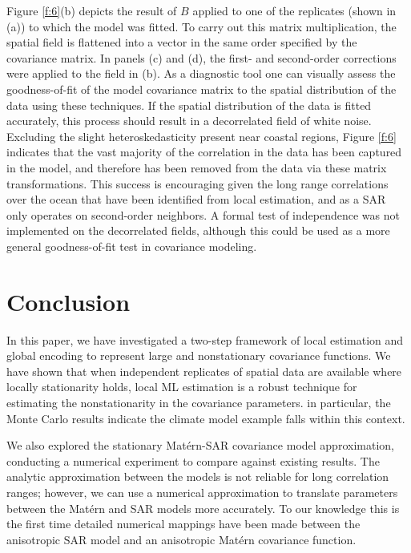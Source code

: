 \documentclass[review]{elsarticle}
\begin{document}
Figure \ref{f:6}(b) depicts the result of $B$ applied to one of the replicates (shown in (a)) to which the model was fitted. To carry out this matrix multiplication, the spatial field is flattened into a vector in the same order specified by the covariance matrix.  In panels (c) and (d), the first- and second-order corrections were applied to the field in (b). As a diagnostic tool one can visually assess the goodness-of-fit of the model covariance matrix to the spatial distribution of the data using these techniques. If the spatial distribution of the data is fitted accurately, this process should result in a decorrelated field of white noise. Excluding the slight heteroskedasticity present near coastal regions, Figure \ref{f:6} indicates that the vast majority of the correlation in the data has been captured in the model, and therefore has been removed from the data via these matrix transformations. This success is encouraging given the long range correlations over the ocean that have been identified from local estimation, and as a SAR only operates on second-order neighbors.  A formal test of independence was not implemented on the decorrelated fields, although this could be used as a more general goodness-of-fit test in covariance modeling.


\section{Conclusion}

In this paper, we have investigated a two-step framework of local estimation and global encoding to represent large and nonstationary covariance functions. We have shown that when independent replicates of spatial data are available where locally stationarity holds, local ML estimation is a robust technique for estimating the nonstationarity in the covariance parameters. in particular, the Monte Carlo results indicate the climate model example falls within this context. 

We also explored the stationary Mat\'ern-SAR covariance model approximation, conducting a numerical experiment to compare against existing results. The analytic approximation between the models is not reliable for long correlation ranges; however, we can use a numerical approximation to translate parameters between the Mat\'ern and SAR models more accurately. To our knowledge this is the first time detailed numerical mappings have been made between the anisotropic SAR model and an anisotropic Mat\'ern covariance function. 
\end{document}
